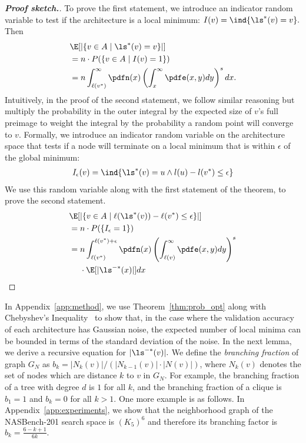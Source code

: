 \begin{proof}[\textbf{Proof sketch.}]



To prove the first statement,
we introduce an indicator random variable to test if the 
architecture is a local minimum: $I(v) = \ind\{\ls^*(v) = v\}.$ Then
\begin{align*}
&\E[|\{v \in A\mid \ls^*(v) = v\}|]\\
&= n \cdot P(\{v \in A \mid I(v) = 1\}) \\
&= n\int_{\ell(v^*)}^{\infty} \pdfn(x) \left(\int_{x}^{\infty} \pdfe(x,y) dy\right)^s dx.
\end{align*}
Intuitively, in the proof of the second statement, we follow similar reasoning but multiply
the probability in the outer integral by the expected size of $v$'s full preimage to weight
the integral by the probability a random point will converge to $v$.
Formally, we introduce an indicator random variable on the architecture space 
that tests if a node will terminate on a local minimum that is
within $\epsilon$ of the global minimum:
\begin{align*}
    I_\epsilon(v) &= \ind\{\ls^*(v) = u \land l(u) - l(v^*) \leq \epsilon\} \\
\end{align*}
We use this random variable along with the first statement of the theorem,
to prove the second statement.
\begin{align*}
&\E[|\{v \in A \mid \ell(\ls^*(v))-\ell(v^*)\leq\epsilon\}|]\\
&= n \cdot P(\{I_\epsilon = 1\})\\
&= n\int_{\ell(v^*)}^{\ell(v^*)+\epsilon}\pdfn(x)
\left(\int_{\ell(v)}^\infty \pdfe(x, y) dy\right)^s\\
&\quad~\cdot\E[|\ls^{-*}(x)|]dx
\end{align*}
\end{proof}

In Appendix~\ref{app:method}, we use Theorem~\ref{thm:prob_opt}
along with Chebyshev's Inequality~\citep{chebyshev1867valeurs}
to show that, in the case where the validation accuracy of each architecture
has Gaussian noise, the expected number of local minima can be bounded in terms of
the standard deviation of the noise.
In the next lemma, we derive a recursive equation for $|\ls^{-*}(v)|.$
We define the \emph{branching fraction} of graph $G_N$ as $b_k=|N_k(v)|/\left(|N_{k-1}(v)|\cdot|N(v)|\right)$,
where $N_k(v)$ denotes the set of nodes which are distance $k$ to $v$ in $G_N$.
For example, the branching fraction of a tree with degree $d$ is $1$ for all $k$,
and the branching fraction of a clique is $b_1=1$ and $b_k=0$ for all $k>1.$
One more example is as follows.
In Appendix~\ref{app:experiments}, 
we show that the neighborhood graph of the
NASBench-201 search space is $(K_5)^6$ and therefore its branching factor is
$b_k=\frac{6-k+1}{6k}.$

